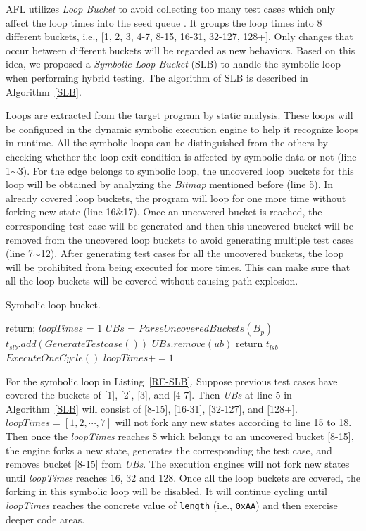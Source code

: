 AFL utilizes \emph{Loop Bucket} to avoid collecting too many test cases 
which only affect the loop times into the seed queue \cite{online:afl}. 
It groups the loop times into 8 different buckets, i.e., 
[1, 2, 3, 4-7, 8-15, 16-31, 32-127, 128+]. Only changes that occur 
between different buckets will be regarded as new behaviors. 
Based on this idea, we proposed a \textit{Symbolic Loop Bucket} (SLB) 
to handle the symbolic loop when performing hybrid testing. The 
algorithm of SLB is described in Algorithm~\ref{SLB}.

Loops are extracted from the target program by static analysis. 
These loops will be configured in the dynamic symbolic execution 
engine to help it recognize loops in runtime. All the symbolic loops 
can be distinguished from the others by checking whether the loop 
exit condition is affected by symbolic data or not (line 1$\sim$3). 
For the edge belongs to symbolic loop, the uncovered loop buckets 
for this loop will be obtained by analyzing the \textit{Bitmap} 
mentioned before (line 5). 
In already covered loop buckets, the program will loop for one more 
time without forking new state (line 16\&17). Once an uncovered bucket 
is reached, the corresponding test case will be generated and then 
this uncovered bucket will be removed from the uncovered loop buckets 
to avoid generating multiple test cases (line 7$\sim$12). After 
generating test cases for all the uncovered buckets, the loop will 
be prohibited from being executed for more times. This can make sure 
that all the loop buckets will be covered without causing path explosion.

\begin{algorithm}
  \LinesNumbered
  \caption{Symbolic loop bucket.}
  \label{SLB}
  {
    return;
  }
  $loopTimes$ = 1\;
  $UBs$ = $ParseUncoveredBuckets(B_p)$\;
  {
    {
      {
        $t_{slb}.add(GenerateTestcase())$\;
        $UBs$.$remove(ub)$\;
      }
    }
    {
      return $t_{lsb}$\;
    }{
      $ExecuteOneCycle()$\;
      $loopTimes += 1$\;
    }
  }
\end{algorithm}  

For the symbolic loop in Listing~\ref{RE-SLB}. Suppose previous 
test cases have covered the buckets of [1], [2], [3], and [4-7]. 
Then \textit{UBs} at line 5 in Algorithm~\ref{SLB} will consist of 
[8-15], [16-31], [32-127], and [128+]. 
$\textit{loopTimes}=[1, 2, \cdots, 7]$ will not fork any new states 
according to line 15 to 18. Then once the \textit{loopTimes} reaches 
8 which belongs to an uncovered bucket [8-15], the engine forks a 
new state,  generates the corresponding the test case, and removes 
bucket [8-15] from \textit{UBs}. The execution engines will not 
fork new states until \textit{loopTimes} reaches 16, 32 and 128. 
Once all the loop buckets are covered, the forking in this 
symbolic loop will be disabled. It will continue cycling until 
\textit{loopTimes} reaches the concrete value of \texttt{length} 
(i.e., \texttt{0xAA}) and then exercise deeper code areas.
